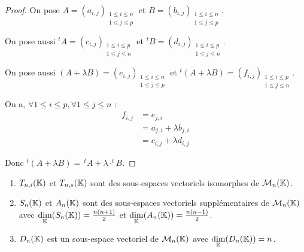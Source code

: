 \documentclass[12pt, a4paper]{report}
\begin{document}
\begin{proof}
    On pose $A = (a_{i,j})_{\substack{1 \le i \le n \\ 1 \le j \le p}}$ et $B = (b_{i,j})_{\substack{1 \le i \le n \\ 1 \le j \le p}}$.
    
    On pose aussi $^tA = (c_{i,j})_{\substack{1 \le i \le p \\ 1 \le j \le n}}$ et $^tB = (d_{i,j})_{\substack{1 \le i \le p \\ 1 \le j \le n}}$.
    
    On pose aussi $(A+\lambda B) = (e_{i,j})_{\substack{1 \le i \le n \\ 1 \le j \le p}}$ et $^t(A+\lambda B) = (f_{i,j})_{\substack{1 \le i \le p \\ 1 \le j \le n}}$.

    On a, $\forall 1 \le i \le p, \forall 1 \le j \le n$ :
    \begin{align*}
        f_{i,j} &= e_{j,i}\\
        &= a_{j,i} + \lambda b_{j,i}\\
        &= c_{i,j} + \lambda d_{i,j}
    \end{align*}

    Donc $^t(A+\lambda B) = \,{^t}A + \lambda \cdot ^tB$.
\end{proof}

\begin{property}
    \begin{enumerate}
        \item $T_{n,i}(\mathbb{K})$ et $T_{n,s}(\mathbb{K})$ sont des sous-espaces vectoriels isomorphes de $\mathcal M_n(\mathbb{K})$.
        \item $S_n(\mathbb{K})$ et $A_n(\mathbb{K})$ sont des sous-espaces vectoriels supplémentaires de $\mathcal M_n(\mathbb{K})$ avec $\underset{\mathbb{K}}\dim(S_n(\mathbb{K})) = \frac{n(n+1)}{2}$ et $\underset{\mathbb{K}}\dim(A_n(\mathbb{K})) = \frac{n(n-1)}{2}$.
        \item $D_n(\mathbb{K})$ est un sous-espace vectoriel de $\mathcal M_n(\mathbb{K})$ avec $\underset{\mathbb{K}}\dim(D_n(\mathbb{K})) = n$.
    \end{enumerate}
\end{property}
\end{document}
